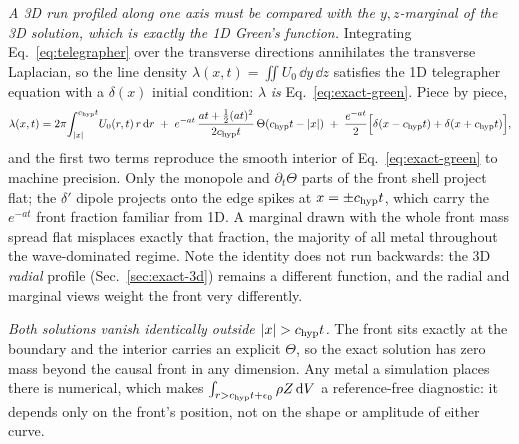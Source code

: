 \emph{A 3D run profiled along one axis must be compared with the
$y,z$-marginal of the 3D solution, which is exactly the 1D Green's
function.} Integrating Eq.~\eqref{eq:telegrapher} over the transverse
directions annihilates the transverse Laplacian, so the line density
$\lambda(x,t)=\iint U_0\,\dd y\,\dd z$ satisfies the 1D telegrapher
equation with a $\delta(x)$ initial condition: $\lambda$ \emph{is}
Eq.~\eqref{eq:exact-green}. Piece by piece,
\begin{equation}
  \label{eq:marginal-3d}
  \lambda(x,t) = 2\pi\!\int_{|x|}^{c_{\rm hyp} t}\! U_0(r,t)\,r\,\dd r
  \;+\; e^{-at}\,\frac{at+\tfrac12(at)^2}{2c_{\rm hyp} t}\,\Theta(c_{\rm hyp} t-|x|)
  \;+\; \frac{e^{-at}}{2}\Big[\delta(x-c_{\rm hyp} t)+\delta(x+c_{\rm hyp} t)\Big] ,
\end{equation}
and the first two terms reproduce the smooth interior of
Eq.~\eqref{eq:exact-green} to machine precision. Only the monopole and
$\partial_t\Theta$ parts of the front shell project flat; the $\delta'$
dipole projects onto the edge spikes at $x=\pm c_{\rm hyp} t$, which carry the
$e^{-at}$ front fraction familiar from 1D. A marginal drawn with the
whole front mass spread flat misplaces exactly that fraction, the
majority of all metal throughout the wave-dominated regime.
Note the identity does not run backwards: the 3D \emph{radial} profile
(Sec.~\ref{sec:exact-3d}) remains a different function, and the radial
and marginal views weight the front very differently.

\emph{Both solutions vanish identically outside $|x|>\chyp t$.} The front
sits exactly at the boundary and the interior carries an explicit
$\Theta$, so the exact solution has zero mass beyond the causal front in
any dimension. Any metal a simulation places there is numerical, which
makes $\int_{r>c_{\rm hyp} t+\epsilon_0}\rho Z\,\dd V$ a reference-free
diagnostic: it depends only on the front's position, not on the shape or
amplitude of either curve.

